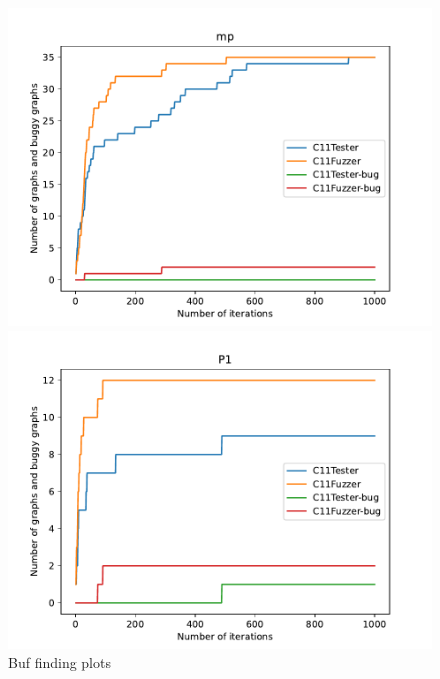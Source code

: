 \begin{figure}[H]
	\begin{minipage}{0.45\textwidth}
		\centering
		\includegraphics[width=\textwidth]{figure/hardbug/mp_bug.pdf}
	\end{minipage}
	\hfill
	\begin{minipage}{0.45\textwidth}
		\centering
		\includegraphics[width=\textwidth]{figure/hardbug/P1_bug.pdf}
	\end{minipage}
	\caption{Buf finding plots}
	\label{c11tester:bug-plot}

\end{figure}










